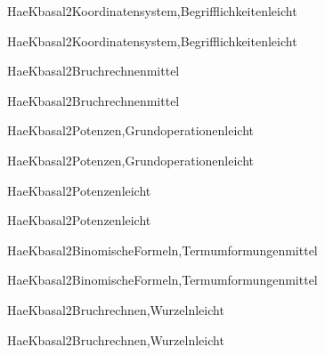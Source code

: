 \documentclass[12pt]{article}
\begin{document}
\begin{Add}{HaeK}{basal2}{Koordinatensystem,Begrifflichkeiten}{leicht}
\solution{ }
\end{Add}
\begin{Add}{HaeK}{basal2}{Koordinatensystem,Begrifflichkeiten}{leicht}
\end{Add}

\begin{Add}{HaeK}{basal2}{Bruchrechnen}{mittel}
\solution{ }
\end{Add}
\begin{Add}{HaeK}{basal2}{Bruchrechnen}{mittel}
\end{Add}

\begin{Add}{HaeK}{basal2}{Potenzen,Grundoperationen}{leicht}
\solution{ }
\end{Add}
\begin{Add}{HaeK}{basal2}{Potenzen,Grundoperationen}{leicht}
\end{Add}

\begin{Add}{HaeK}{basal2}{Potenzen}{leicht}
\solution{ }
\end{Add}
\begin{Add}{HaeK}{basal2}{Potenzen}{leicht}
\end{Add}

\begin{Add}{HaeK}{basal2}{BinomischeFormeln,Termumformungen}{mittel}
\solution{ }
\end{Add}
\begin{Add}{HaeK}{basal2}{BinomischeFormeln,Termumformungen}{mittel}
\end{Add}

\begin{Add}{HaeK}{basal2}{Bruchrechnen,Wurzeln}{leicht}
\solution{ }
\end{Add}
\begin{Add}{HaeK}{basal2}{Bruchrechnen,Wurzeln}{leicht}
\end{Add}
\end{document}
